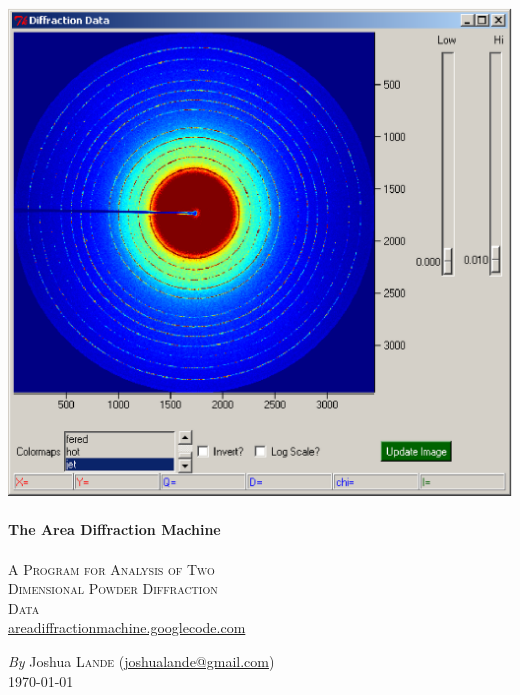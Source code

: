 \begin{titlepage}

\begin{center}


\includegraphics[scale=.5]{figures/diffraction_data_window.eps}\\[1.5cm]

\HRule \\[0.4cm]
{\Huge\rm\bfseries The Area Diffraction Machine}\\[0.1cm]
\HRule \\[1.5cm]

{\Huge\rm \textsc{A Program for Analysis of Two\\
Dimensional Powder Diffraction \\[.4cm]
Data}}\\[1.5cm]

{\Large\rm \href{http://areadiffractionmachine.googlecode.com}{areadiffractionmachine.googlecode.com}}


\vfill

{\large \emph{By} Joshua \textsc{Lande} (\href{mailto:joshualande@gmail.com}{joshualande@gmail.com})}\\[.1cm]

{\large \today}

\end{center}

\end{titlepage}


